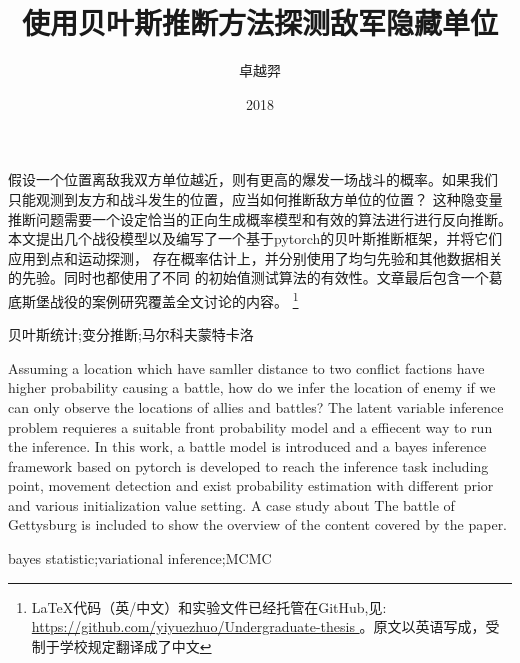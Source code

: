 \documentclass{sicnuthesis}
\title{使用贝叶斯推断方法探测敌军隐藏单位}
\author{卓越羿}
\date{2018}
\begin{document}
\frontmatter %

\maketitle

\newpage

\begin{abstractch}

假设一个位置离敌我双方单位越近，则有更高的爆发一场战斗的概率。如果我们
只能观测到友方和战斗发生的位置，应当如何推断敌方单位的位置？
这种隐变量推断问题需要一个设定恰当的正向生成概率模型和有效的算法进行进行反向推断。
本文提出几个战役模型以及编写了一个基于pytorch的贝叶斯推断框架，并将它们应用到点和运动探测，
存在概率估计上，并分别使用了均匀先验和其他数据相关的先验。同时也都使用了不同
的初始值测试算法的有效性。文章最后包含一个葛底斯堡战役的案例研究覆盖全文讨论的内容。
\footnote{LaTeX代码（英/中文）和实验文件已经托管在GitHub,见: \url{ https://github.com/yiyuezhuo/Undergraduate-thesis } 。原文以英语写成，受制于学校规定翻译成了中文}

\end{abstractch}

\begin{keywordsch}贝叶斯统计;变分推断;马尔科夫蒙特卡洛\end{keywordsch}

\newpage


\begin{abstracten}

Assuming a location which have samller distance to two conflict factions have higher probability causing a battle,
how do we infer the location of enemy if we can only observe the locations of allies and battles? 
The latent variable inference problem requieres a suitable front probability model and a effiecent way to run the 
inference. In this work, a battle model is introduced and a bayes inference framework based on pytorch 
is developed to reach the inference task including point, movement detection and 
exist probability estimation with different prior and various initialization value setting.
A case study about The battle of Gettysburg is included to show the overview of the content covered by the paper.

\end{abstracten}

\begin{keywordsen}bayes statistic;variational inference;MCMC\end{keywordsen}
\end{document}
